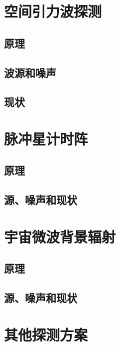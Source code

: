 \section{空间引力波探测}
\subsection{原理}
\subsection{波源和噪声}
\subsection{现状}

\section{脉冲星计时阵}
\subsection{原理}
\subsection{源、噪声和现状}

\section{宇宙微波背景辐射}
\subsection{原理}
\subsection{源、噪声和现状}

\section{其他探测方案}
